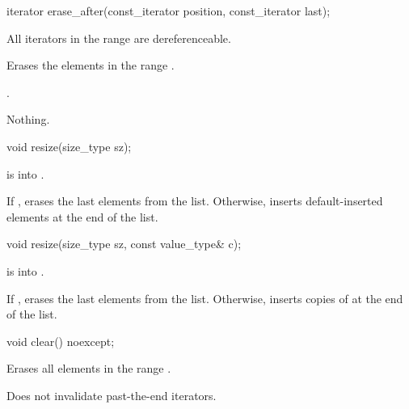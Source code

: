 \begin{itemdecl}
iterator erase_after(const_iterator position, const_iterator last);
\end{itemdecl}

\begin{itemdescr}
\pnum
\expects
All iterators in the range  are dereferenceable.

\pnum
\effects
Erases the elements in the range .

\pnum
\returns
{}.

\pnum
\throws
Nothing.
\end{itemdescr}

%
\begin{itemdecl}
void resize(size_type sz);
\end{itemdecl}

\begin{itemdescr}
\pnum
\expects
{} is  into .

\pnum
\effects
If , erases the last  elements from the list. Otherwise, inserts  default-inserted
elements at the end of the list.
\end{itemdescr}

\begin{itemdecl}
void resize(size_type sz, const value_type& c);
\end{itemdecl}

\begin{itemdescr}
\pnum
\expects
{} is  into .

\pnum
\effects
If , erases the last  elements from the list. Otherwise, inserts 
copies of  at the end of the list.
\end{itemdescr}


%
\begin{itemdecl}
void clear() noexcept;
\end{itemdecl}

\begin{itemdescr}
\pnum
\effects
Erases all elements in the range .

\pnum
\remarks
Does not invalidate past-the-end iterators.
\end{itemdescr}

